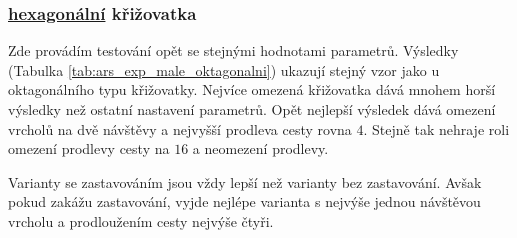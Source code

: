 \subsubsection{ \hyperref[subsec:hexagonalni_typ]{hexagonální} křižovatka}
\label{subsubsec:exp_ars_mala_hexagonalni_krizovatka}

Zde provádím testování opět se stejnými hodnotami parametrů.
Výsledky (Tabulka \ref{tab:ars_exp_male_oktagonalni}) ukazují stejný vzor jako u oktagonálního typu křižovatky.
Nejvíce omezená křižovatka dává mnohem horší výsledky než ostatní nastavení parametrů.
Opět nejlepší výsledek dává omezení vrcholů na dvě návštěvy a nejvyšší prodleva cesty rovna $4$.
Stejně tak nehraje roli omezení prodlevy cesty na $16$ a neomezení prodlevy.

Varianty se zastavováním jsou vždy lepší než varianty bez zastavování.
Avšak pokud zakážu zastavování, vyjde nejlépe varianta s nejvýše jednou návštěvou vrcholu
a prodloužením cesty nejvýše čtyři.


